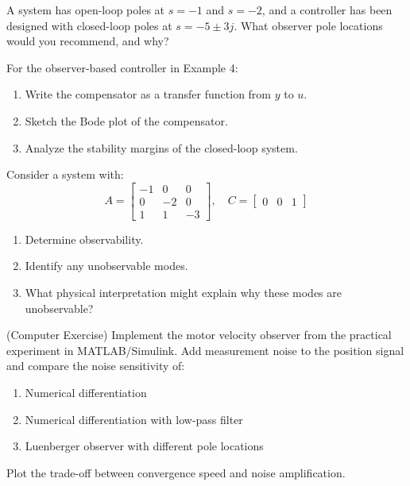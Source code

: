 \begin{exercise}
A system has open-loop poles at $s = -1$ and $s = -2$, and a controller has been designed with closed-loop poles at $s = -5 \pm 3j$. What observer pole locations would you recommend, and why?
\end{exercise}

\begin{exercise}
For the observer-based controller in Example 4:
\begin{enumerate}
    \item[(a)] Write the compensator as a transfer function from $y$ to $u$.
    \item[(b)] Sketch the Bode plot of the compensator.
    \item[(c)] Analyze the stability margins of the closed-loop system.
\end{enumerate}
\end{exercise}

\begin{exercise}
Consider a system with:
\begin{equation}
A = \begin{bmatrix} -1 & 0 & 0 \\ 0 & -2 & 0 \\ 1 & 1 & -3 \end{bmatrix}, \quad
C = \begin{bmatrix} 0 & 0 & 1 \end{bmatrix}
\end{equation}
\begin{enumerate}
    \item[(a)] Determine observability.
    \item[(b)] Identify any unobservable modes.
    \item[(c)] What physical interpretation might explain why these modes are unobservable?
\end{enumerate}
\end{exercise}

\begin{exercise}
(Computer Exercise) Implement the motor velocity observer from the practical experiment in MATLAB/Simulink. Add measurement noise to the position signal and compare the noise sensitivity of:
\begin{enumerate}
    \item[(a)] Numerical differentiation
    \item[(b)] Numerical differentiation with low-pass filter
    \item[(c)] Luenberger observer with different pole locations
\end{enumerate}
Plot the trade-off between convergence speed and noise amplification.
\end{exercise}

